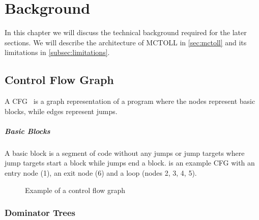 

\chapter{Background}\label{ch:background}

In this chapter we will discuss the technical background required for the later sections.
We will describe the architecture of MCTOLL in \cref{sec:mctoll} and its limitations in \cref{subsec:limitations}.


\section{Control Flow Graph}\label{sec:cfg}

A \gls{CFG}~\parencite{cfg} is a graph representation of a program where the nodes represent basic blocks, while edges represent jumps.

\paragraph{Basic Blocks}
A basic block is a segment of code without any jumps or jump targets where jump targets start a block while jumps end a block.
 is an example \gls{CFG} with an entry node (1), an exit node (6) and a loop (nodes 2, 3, 4, 5).

\begin{figure}[htpb]
    \centering
    \caption{Example of a control flow graph}
    \label{fig:cfg}
\end{figure}

\subsection{Dominator Trees}\label{subsec:dominator-trees}

